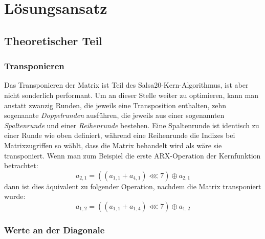\documentclass[course=erap]{aspdoc}
\begin{document}
\section{Lösungsansatz}
\subsection{Theoretischer Teil}
\subsubsection{Transponieren} \label{transpose}

Das Transponieren der Matrix ist Teil des Salsa20-Kern-Algorithmus, ist aber nicht sonderlich performant.
Um an dieser Stelle weiter zu optimieren, kann man anstatt zwanzig Runden, die jeweils eine Transposition enthalten, zehn sogenannte \emph{Doppelrunden}
ausführen, die jeweils aus einer sogenannten \emph{Spaltenrunde} und einer \emph{Reihenrunde} bestehen. Eine Spaltenrunde ist identisch zu einer
Runde wie oben definiert, während eine Reihenrunde die Indizes bei Matrixzugriffen so wählt, dass die Matrix behandelt wird
als wäre sie transponiert.
Wenn man zum Beispiel die erste ARX-Operation der Kernfunktion betrachtet:
\[
    a_{2,1} = ((a_{1,1} + a_{4,1}) \lll 7) \oplus a_{2,1} 
\]
dann ist dies äquivalent zu folgender Operation, nachdem die Matrix transponiert wurde:
\[
    a_{1,2} = ((a_{1,1} + a_{1,4}) \lll 7) \oplus a_{1,2}
\]

\subsubsection{Werte an der Diagonale}
\end{document}
